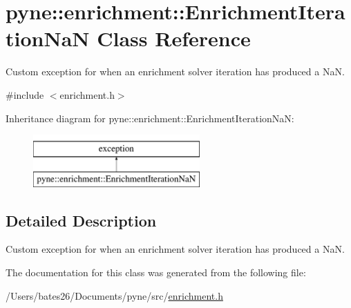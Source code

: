 \hypertarget{classpyne_1_1enrichment_1_1_enrichment_iteration_na_n}{\section{pyne\+:\+:enrichment\+:\+:Enrichment\+Iteration\+Na\+N Class Reference}
\label{classpyne_1_1enrichment_1_1_enrichment_iteration_na_n}
}


Custom exception for when an enrichment solver iteration has produced a Na\+N.  




{\ttfamily \#include $<$enrichment.\+h$>$}

Inheritance diagram for pyne\+:\+:enrichment\+:\+:Enrichment\+Iteration\+Na\+N\+:\begin{figure}[H]
\begin{center}
\leavevmode
\includegraphics[height=2.000000cm]{classpyne_1_1enrichment_1_1_enrichment_iteration_na_n}
\end{center}
\end{figure}


\subsection{Detailed Description}
Custom exception for when an enrichment solver iteration has produced a Na\+N. 

The documentation for this class was generated from the following file\+:\begin{DoxyCompactItemize}
\item 
/\+Users/bates26/\+Documents/pyne/src/\hyperlink{enrichment_8h}{enrichment.\+h}\end{DoxyCompactItemize}
